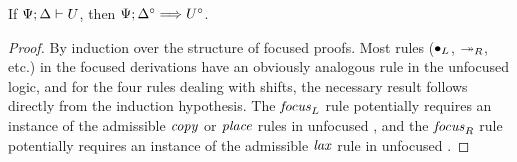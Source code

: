 \bigskip
\begin{theorem}
If ${\Psi};{\Delta} \vdash {U} \mathstrut$, then $\Psi; \Delta^\circ \Longrightarrow U^\circ$.
\end{theorem}

\begin{proof}
  By induction over the structure of focused proofs. 
  Most rules (${\mathbin{\bullet}}_L$, $\twoheadrightarrow_R$, etc.) in the
  focused derivations have an obviously analogous rule in the unfocused
  logic, and for the four rules dealing with shifts,
  the necessary result follows directly from the induction hypothesis. 
  The ${\it focus}_L$ rule potentially requires an instance of the
  admissible ${\it copy}$ or ${\it place}$ rules in unfocused \ollll, and
  the ${\it focus}_R$ rule potentially requires an instance of the
  admissible ${\it lax}$ rule in unfocused \ollll.
\end{proof}

